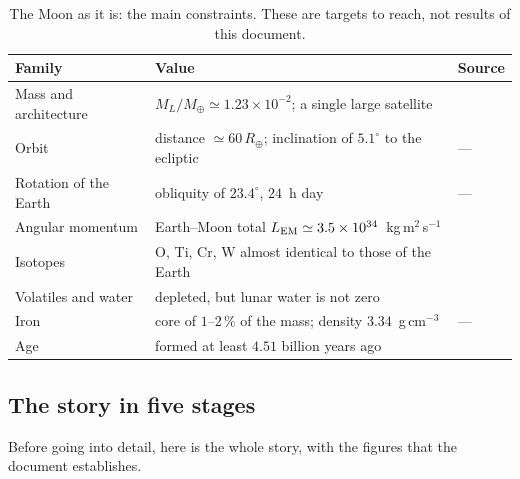 \documentclass[11pt,a4paper]{article}
\newcommand{\Rt}{\ensuremath{R_\oplus}}
\newcommand{\Mt}{\ensuremath{M_\oplus}}
\newcommand{\LEM}{\ensuremath{L_{\rm EM}}}
\begin{document}
\begin{table}[htbp]
\centering
\caption{The Moon as it is: the main constraints. These are targets to reach, not results of this document.\label{tab:contraintes}}
\small
\begin{tabular}{>{\raggedright\arraybackslash}p{3.2cm}>{\raggedright\arraybackslash}p{7.6cm}>{\raggedright\arraybackslash}p{4.2cm}}
\toprule
Family & Value & Source \\
\midrule
Mass and architecture & $M_L/\Mt\simeq1.23\times10^{-2}$; a single large satellite & \citep{Williams2014} \\
Orbit & distance $\simeq60\,\Rt$; inclination of $5.1^\circ$ to the ecliptic & --- \\
Rotation of the Earth & obliquity of $23.4^\circ$, $24$~h day & --- \\
Angular momentum & Earth--Moon total $\LEM\simeq3.5\times10^{34}$~kg\,m$^2$\,s$^{-1}$ & \citep{Canup2004,CanupAsphaug2001} \\
Isotopes & O, Ti, Cr, W almost identical to those of the Earth & \citep{Young2016,Zhang2012,Dauphas2017,Kruijer2015,Touboul2015} \\
Volatiles and water & depleted, but lunar water is not zero & \citep{Saal2008,Saal2013,Hauri2011} \\
Iron & core of $1$--$2\,\%$ of the mass; density $3.34$~g\,cm$^{-3}$ & --- \\
Age & formed at least $4.51$ billion years ago & \citep{Barboni2017} \\
\bottomrule
\end{tabular}
\end{table}

\subsection{The story in five stages}

Before going into detail, here is the whole story, with the figures that the document establishes.
\end{document}
